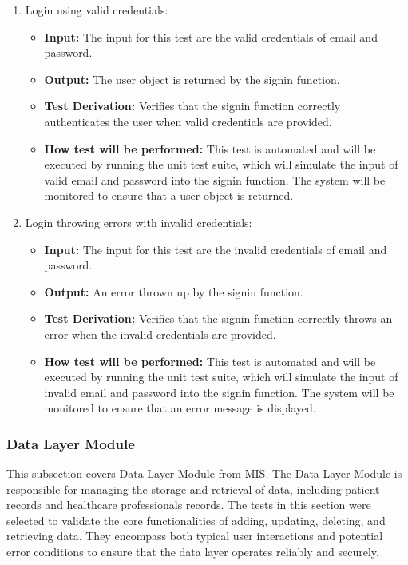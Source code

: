\documentclass[12pt, titlepage]{article}
\begin{document}
\begin{enumerate}
  \item Login using valid credentials:
    \begin{itemize}
      \item \textbf{Input:} The input for this test are the valid credentials of email and password. 
      \item \textbf{Output:} The user object is returned by the signin function.
      \item \textbf{Test Derivation:} Verifies that the signin function correctly authenticates the user when valid credentials are provided.
      \item \textbf{How test will be performed:} This test is automated and will be executed by running the unit test suite, which will simulate the input of valid email and password into the signin function. The system will be monitored to ensure that a user object is returned.
    \end{itemize}

  \item Login throwing errors with invalid credentials:
    \begin{itemize}
      \item \textbf{Input:} The input for this test are the invalid credentials of email and password. 
      \item \textbf{Output:} An error thrown up by the signin function.
      \item \textbf{Test Derivation:} Verifies that the signin function correctly throws an error when the invalid credentials are provided.
      \item \textbf{How test will be performed:} This test is automated and will be executed by running the unit test suite, which will simulate the input of invalid email and password into the signin function. The system will be monitored to ensure that an error message is displayed.
    \end{itemize}
\end{enumerate}

\subsubsection{Data Layer Module}

This subsection covers Data Layer Module from \href{https://github.com/PKALXI/RapidCare/blob/main/docs/Design/SoftDetailedDes/MIS.pdf}{MIS}. The Data Layer Module is responsible for managing the storage and retrieval of data, including patient records and healthcare professionals records. The tests in this section were selected to validate the core functionalities of adding, updating, deleting, and retrieving data. They encompass both typical user interactions and potential error conditions to ensure that the data layer operates reliably and securely.
\end{document}
